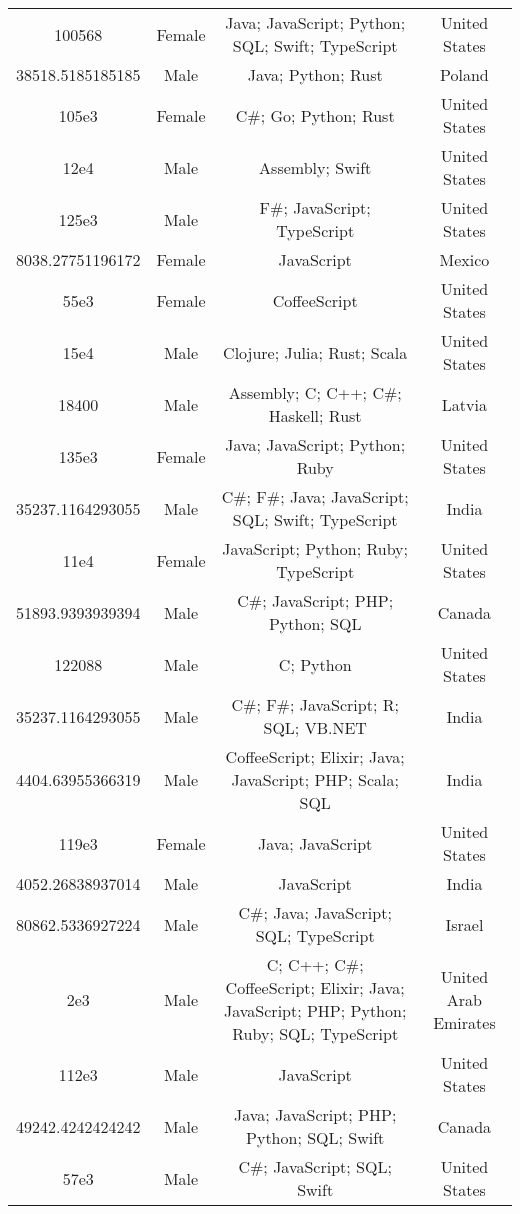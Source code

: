 \begin{center}
\begin{tabular}{ |c|c|c|c| }
100568  &  Female  &  Java; JavaScript; Python; SQL; Swift; TypeScript  &  United States  \\ 
38518.5185185185  &  Male  &  Java; Python; Rust  &  Poland  \\ 
105e3  &  Female  &  C\#; Go; Python; Rust  &  United States  \\ 
12e4  &  Male  &  Assembly; Swift  &  United States  \\ 
125e3  &  Male  &  F\#; JavaScript; TypeScript  &  United States  \\ 
8038.27751196172  &  Female  &  JavaScript  &  Mexico  \\ 
55e3  &  Female  &  CoffeeScript  &  United States  \\ 
15e4  &  Male  &  Clojure; Julia; Rust; Scala  &  United States  \\ 
18400  &  Male  &  Assembly; C; C++; C\#; Haskell; Rust  &  Latvia  \\ 
135e3  &  Female  &  Java; JavaScript; Python; Ruby  &  United States  \\ 
35237.1164293055  &  Male  &  C\#; F\#; Java; JavaScript; SQL; Swift; TypeScript  &  India  \\ 
11e4  &  Female  &  JavaScript; Python; Ruby; TypeScript  &  United States  \\ 
51893.9393939394  &  Male  &  C\#; JavaScript; PHP; Python; SQL  &  Canada  \\ 
122088  &  Male  &  C; Python  &  United States  \\ 
35237.1164293055  &  Male  &  C\#; F\#; JavaScript; R; SQL; VB.NET  &  India  \\ 
4404.63955366319  &  Male  &  CoffeeScript; Elixir; Java; JavaScript; PHP; Scala; SQL  &  India  \\ 
119e3  &  Female  &  Java; JavaScript  &  United States  \\ 
4052.26838937014  &  Male  &  JavaScript  &  India  \\ 
80862.5336927224  &  Male  &  C\#; Java; JavaScript; SQL; TypeScript  &  Israel  \\ 
2e3  &  Male  &  C; C++; C\#; CoffeeScript; Elixir; Java; JavaScript; PHP; Python; Ruby; SQL; TypeScript  &  United Arab Emirates  \\ 
112e3  &  Male  &  JavaScript  &  United States  \\ 
49242.4242424242  &  Male  &  Java; JavaScript; PHP; Python; SQL; Swift  &  Canada  \\ 
57e3  &  Male  &  C\#; JavaScript; SQL; Swift  &  United States  \\ 

\end{tabular}
\end{center}
